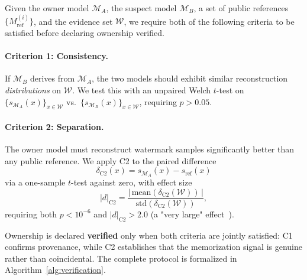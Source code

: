 \documentclass{article}
\begin{document}
Given the owner model $\mathcal{M}_A$, the suspect model 
$\mathcal{M}_B$, a set of public references $\{M_{\text{ref}}^{(i)}\}$, 
and the evidence set $\mathcal{W}$, we require both of the 
following criteria to be satisfied before declaring ownership 
verified.

\paragraph{Criterion 1: Consistency.}
If $\mathcal{M}_B$ derives from $\mathcal{M}_A$, the two models 
should exhibit similar reconstruction \emph{distributions} on 
$\mathcal{W}$. We test this with an unpaired Welch $t$-test on 
$\{s_{\mathcal{M}_A}(x)\}_{x\in\mathcal{W}}$ vs.\ 
$\{s_{\mathcal{M}_B}(x)\}_{x\in\mathcal{W}}$, requiring 
$p > 0.05$.

\paragraph{Criterion 2: Separation.}
The owner model must reconstruct watermark samples significantly 
better than any public reference. We apply C2 to the paired 
difference
\begin{equation}
\delta_{\text{C2}}(x) = s_{\mathcal{M}_A}(x) - s_{\text{ref}}(x)
\label{eq:delta_c2}
\end{equation}
via a one-sample $t$-test against zero, with effect size
\begin{equation}
|d|_{\text{C2}} = \frac{|\,\text{mean}(\delta_{\text{C2}}(\mathcal{W}))\,|}
{\text{std}(\delta_{\text{C2}}(\mathcal{W}))},
\label{eq:paired_c2}
\end{equation}
requiring both $p < 10^{-6}$ and $|d|_{\text{C2}} > 2.0$ 
(a "very large" effect~\citep{cohen1988statistical}).

Ownership is declared \textbf{verified} only when both criteria 
are jointly satisfied: C1 confirms provenance, while C2 establishes 
that the memorization signal is genuine rather than coincidental. 
The complete protocol is formalized in Algorithm~\ref{alg:verification}.
\end{document}
